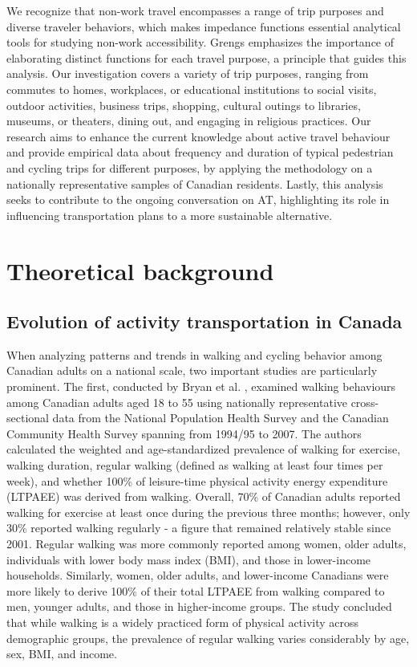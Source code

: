 \documentclass[preprint, 3p,
authoryear]{elsarticle} %
\begin{document}
We recognize that non-work travel encompasses a range of trip purposes
and diverse traveler behaviors, which makes impedance functions
essential analytical tools for studying non-work accessibility. Grengs
\citeyearpar{grengs2015nonwork} emphasizes the importance of elaborating
distinct functions for each travel purpose, a principle that guides this
analysis. Our investigation covers a variety of trip purposes, ranging
from commutes to homes, workplaces, or educational institutions to
social visits, outdoor activities, business trips, shopping, cultural
outings to libraries, museums, or theaters, dining out, and engaging in
religious practices. Our research aims to enhance the current knowledge
about active travel behaviour and provide empirical data about frequency
and duration of typical pedestrian and cycling trips for different
purposes, by applying the methodology on a nationally representative
samples of Canadian residents. Lastly, this analysis seeks to contribute
to the ongoing conversation on AT, highlighting its role in influencing
transportation plans to a more sustainable alternative.

\section{Theoretical background}\label{theoretical-background}

\subsection{Evolution of activity transportation in
Canada}\label{evolution-of-activity-transportation-in-canada}

When analyzing patterns and trends in walking and cycling behavior among
Canadian adults on a national scale, two important studies are
particularly prominent. The first, conducted by Bryan et al.
\citeyearpar{bryan2009}, examined walking behaviours among Canadian
adults aged 18 to 55 using nationally representative cross-sectional
data from the National Population Health Survey and the Canadian
Community Health Survey spanning from 1994/95 to 2007. The authors
calculated the weighted and age-standardized prevalence of walking for
exercise, walking duration, regular walking (defined as walking at least
four times per week), and whether 100\% of leisure-time physical
activity energy expenditure (LTPAEE) was derived from walking. Overall,
70\% of Canadian adults reported walking for exercise at least once
during the previous three months; however, only 30\% reported walking
regularly - a figure that remained relatively stable since 2001. Regular
walking was more commonly reported among women, older adults,
individuals with lower body mass index (BMI), and those in lower-income
households. Similarly, women, older adults, and lower-income Canadians
were more likely to derive 100\% of their total LTPAEE from walking
compared to men, younger adults, and those in higher-income groups. The
study concluded that while walking is a widely practiced form of
physical activity across demographic groups, the prevalence of regular
walking varies considerably by age, sex, BMI, and income.
\end{document}
